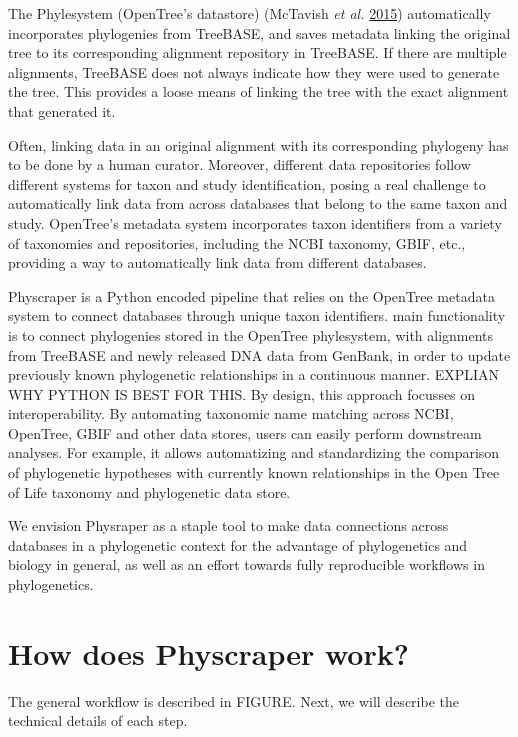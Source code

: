 \documentclass[]{article}
\begin{document}
The Phylesystem (OpenTree's datastore) (McTavish \emph{et al.} \protect\hyperlink{ref-mctavish2015phylesystem}{2015}) automatically incorporates phylogenies from TreeBASE, and saves metadata linking the original tree to its corresponding alignment repository in TreeBASE. If there are multiple alignments, TreeBASE does not always indicate how they were used to generate the tree. This provides a loose means of linking the tree with the exact alignment that generated it.

Often, linking data in an original alignment with its corresponding phylogeny has to be done by a human curator.
Moreover, different data repositories follow different systems for taxon and study identification, posing a real challenge to automatically link data from across databases that belong to the same taxon and study.
OpenTree's metadata system incorporates taxon identifiers from a variety of taxonomies and repositories, including the NCBI taxonomy, GBIF, etc., providing a way to automatically link data from different databases.

Physcraper is a Python encoded pipeline that relies on the OpenTree metadata system to connect databases through unique taxon identifiers.
main functionality is to connect phylogenies stored in the OpenTree phylesystem, with alignments from TreeBASE and newly released DNA data from GenBank, in order to update previously known phylogenetic relationships in a continuous manner.
EXPLIAN WHY PYTHON IS BEST FOR THIS.
By design, this approach focusses on interoperability. By automating taxonomic name matching across NCBI, OpenTree, GBIF and other data stores, users can easily perform downstream analyses.
For example, it allows automatizing and standardizing the comparison of phylogenetic hypotheses with currently known relationships in the Open Tree of Life taxonomy and phylogenetic data store.

We envision Physraper as a staple tool to make data connections across databases in a phylogenetic context for the advantage of phylogenetics and biology in general, as well as an effort towards fully reproducible workflows in phylogenetics.

\hypertarget{how-does-physcraper-work}{%
\section{How does Physcraper work?}\label{how-does-physcraper-work}}

The general workflow is described in FIGURE. Next, we will describe the technical details of each step.
\end{document}
